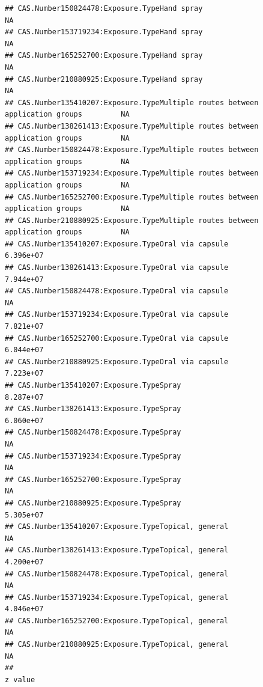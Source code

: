 \documentclass[
  12pt,
]{article}
\begin{document}
\begin{verbatim}
## CAS.Number150824478:Exposure.TypeHand spray                                         NA
## CAS.Number153719234:Exposure.TypeHand spray                                         NA
## CAS.Number165252700:Exposure.TypeHand spray                                         NA
## CAS.Number210880925:Exposure.TypeHand spray                                         NA
## CAS.Number135410207:Exposure.TypeMultiple routes between application groups         NA
## CAS.Number138261413:Exposure.TypeMultiple routes between application groups         NA
## CAS.Number150824478:Exposure.TypeMultiple routes between application groups         NA
## CAS.Number153719234:Exposure.TypeMultiple routes between application groups         NA
## CAS.Number165252700:Exposure.TypeMultiple routes between application groups         NA
## CAS.Number210880925:Exposure.TypeMultiple routes between application groups         NA
## CAS.Number135410207:Exposure.TypeOral via capsule                            6.396e+07
## CAS.Number138261413:Exposure.TypeOral via capsule                            7.944e+07
## CAS.Number150824478:Exposure.TypeOral via capsule                                   NA
## CAS.Number153719234:Exposure.TypeOral via capsule                            7.821e+07
## CAS.Number165252700:Exposure.TypeOral via capsule                            6.044e+07
## CAS.Number210880925:Exposure.TypeOral via capsule                            7.223e+07
## CAS.Number135410207:Exposure.TypeSpray                                       8.287e+07
## CAS.Number138261413:Exposure.TypeSpray                                       6.060e+07
## CAS.Number150824478:Exposure.TypeSpray                                              NA
## CAS.Number153719234:Exposure.TypeSpray                                              NA
## CAS.Number165252700:Exposure.TypeSpray                                              NA
## CAS.Number210880925:Exposure.TypeSpray                                       5.305e+07
## CAS.Number135410207:Exposure.TypeTopical, general                                   NA
## CAS.Number138261413:Exposure.TypeTopical, general                            4.200e+07
## CAS.Number150824478:Exposure.TypeTopical, general                                   NA
## CAS.Number153719234:Exposure.TypeTopical, general                            4.046e+07
## CAS.Number165252700:Exposure.TypeTopical, general                                   NA
## CAS.Number210880925:Exposure.TypeTopical, general                                   NA
##                                                                                z value

\end{verbatim}
\end{document}
